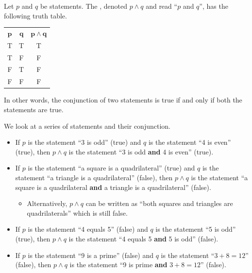 \begin{definition}[Conjunction]
    Let $p$ and $q$ be statements. The , denoted $p \land q$ and read ``$p$ and $q$'', has the following truth table.
    \begin{table}[H]
        \centering
        \begin{tabular}{|c|c||c|}
            \hline
            $\boldsymbol{p}$ & $\boldsymbol{q}$ & $\boldsymbol{p \land q}$ \\ \hhline{|=|=#=|}
            T & T & T \\ \hline
            T & F & F \\ \hline
            F & T & F \\ \hline
            F & F & F \\ \hline
        \end{tabular}
    \end{table}
\end{definition}

In other words, the conjunction of two statements is true if and only if both the statements are true.

\begin{example}
    We look at a series of statements and their conjunction.
    \begin{itemize}
        \item If $p$ is the statement ``3 is odd'' (true) and $q$ is the statement ``4 is even'' (true), then $p \land q$ is the statement ``3 is odd \textbf{and} 4 is even'' (true).
        \item If $p$ is the statement ``a square is a quadrilateral'' (true) and $q$ is the statement ``a triangle is a quadrilateral'' (false), then $p \land q$ is the statement ``a square is a quadrilateral \textbf{and} a triangle is a quadrilateral'' (false).
        \begin{itemize}
            \item Alternatively, $p \land q$ can be written as ``both squares and triangles are quadrilaterals'' which is still false.
        \end{itemize}
        \item If $p$ is the statement ``4 equals 5'' (false) and $q$ is the statement ``5 is odd'' (true), then $p \land q$ is the statement ``4 equals 5 \textbf{and} 5 is odd'' (false).
        \item If $p$ is the statement ``9 is a prime'' (false) and $q$ is the statement ``$3 + 8 = 12$'' (false), then $p \land q$ is the statement ``9 is prime \textbf{and} $3 + 8 = 12$'' (false).
    \end{itemize}
\end{example}

